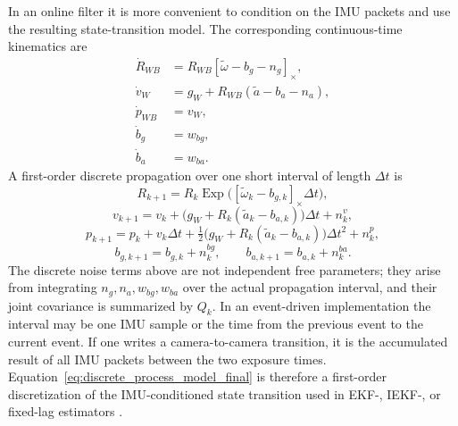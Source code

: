 \documentclass[11pt]{report}
\newcommand{\Exp}{\operatorname{Exp}}
\newcommand{\crossmat}[1]{\left[#1\right]_{\times}}
\newcommand{\Half}{\tfrac12}
\begin{document}
In an online filter it is more convenient to condition on the IMU packets and use the resulting state-transition model. The corresponding continuous-time kinematics are
\begin{align}
\dot R_{WB} &= R_{WB}\crossmat{\widetilde\omega-b_g-n_g},\\
\dot v_W &= g_W + R_{WB}(\widetilde a-b_a-n_a),\\
\dot p_{WB} &= v_W,\\
\dot b_g &= w_{bg},\\
\dot b_a &= w_{ba}.
\end{align}
A first-order discrete propagation over one short interval of length $\Delta t$ is
\begin{equation}
R_{k+1}=R_k\Exp\!\big(\crossmat{\widetilde\omega_k-b_{g,k}}\Delta t\big),
\end{equation}
\begin{equation}
v_{k+1}=v_k+\big(g_W+R_k(\widetilde a_k-b_{a,k})\big)\Delta t+n_k^v,
\end{equation}
\begin{equation}
p_{k+1}=p_k+v_k\Delta t+\Half\big(g_W+R_k(\widetilde a_k-b_{a,k})\big)\Delta t^2+n_k^p,
\end{equation}
\begin{equation}
b_{g,k+1}=b_{g,k}+n_k^{bg},\qquad b_{a,k+1}=b_{a,k}+n_k^{ba}.
\label{eq:discrete_process_model_final}
\end{equation}
The discrete noise terms above are not independent free parameters; they arise from integrating $n_g,n_a,w_{bg},w_{ba}$ over the actual propagation interval, and their joint covariance is summarized by $Q_k$. In an event-driven implementation the interval may be one IMU sample or the time from the previous event to the current event. If one writes a camera-to-camera transition, it is the accumulated result of all IMU packets between the two exposure times. Equation~\eqref{eq:discrete_process_model_final} is therefore a first-order discretization of the IMU-conditioned state transition used in EKF-, IEKF-, or fixed-lag estimators \citep{mourikis2007msckf,forster2017preintegration,barrau2017invariant}.
\end{document}
